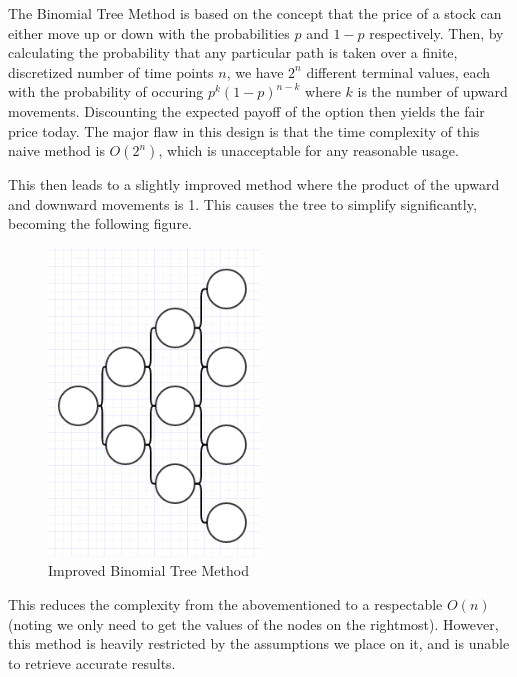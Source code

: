 \documentclass{article}
\begin{document}
The Binomial Tree Method is based on the concept that the price of a stock can either move up or down with the probabilities \(p\) and \(1-p\) respectively. Then, by calculating the probability that any particular path is taken over a finite, discretized number of time points \(n\), we have \(2^n\) different terminal values, each with the probability of occuring \(p^k(1-p)^{n-k}\) where \(k\) is the number of upward movements. Discounting the expected payoff of the option then yields the fair price today. The major flaw in this design is that the time complexity of this naive method is \(O(2^n)\), which is unacceptable for any reasonable usage.

This then leads to a slightly improved method where the product of the upward and downward movements is 1. This causes the tree to simplify significantly, becoming the following figure.

\begin{figure}[H]
  \includegraphics[width=0.5\textwidth]{btm_improved}
  \caption{Improved Binomial Tree Method}
  \label{figure:name}
\end{figure}

This reduces the complexity from the abovementioned to a respectable \(O(n)\) (noting we only need to get the values of the nodes on the rightmost). However, this method is heavily restricted by the assumptions we place on it, and is unable to retrieve accurate results.
\end{document}
